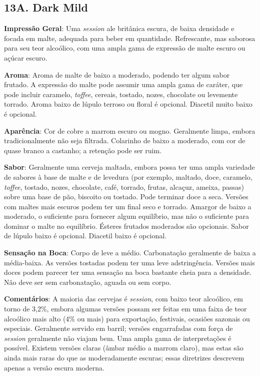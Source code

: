 \subsection*{13A. Dark Mild}
\textbf{Impressão Geral}: Uma \textit{session} ale britânica escura, de baixa densidade e focada em malte, adequada para beber em quantidade. Refrescante, mas saborosa para seu teor alcoólico, com uma ampla gama de expressão de malte escuro ou açúcar escuro.

\textbf{Aroma}: Aroma de malte de baixo a moderado, podendo ter algum sabor frutado. A expressão do malte pode assumir uma ampla gama de caráter, que pode incluir caramelo, \textit{toffee}, cereais, tostado, nozes, chocolate ou levemente torrado. Aroma baixo de lúpulo terroso ou floral é opcional. Diacetil muito baixo é opcional.

\textbf{Aparência}: Cor de cobre a marrom escuro ou mogno. Geralmente limpa, embora tradicionalmente não seja filtrada. Colarinho de baixo a moderado, com cor de quase branco a castanho; a retenção pode ser ruim.

\textbf{Sabor}: Geralmente uma cerveja maltada, embora possa ter uma ampla variedade de sabores à base de malte e de levedura (por exemplo, maltado, doce, caramelo, \textit{toffee}, tostado, nozes, chocolate, café, torrado, frutas, alcaçuz, ameixa, passas) sobre uma base de pão, biscoito ou tostado. Pode terminar doce a seca. Versões com maltes mais escuros podem ter um final seco e torrado. Amargor de baixo a moderado, o suficiente para fornecer algum equilíbrio, mas não o suficiente para dominar o malte no equilíbrio. Ésteres frutados moderados são opcionais. Sabor de lúpulo baixo é opcional. Diacetil baixo é opcional.

\textbf{Sensação na Boca}: Corpo de leve a médio. Carbonatação geralmente de baixa a média-baixa. As versões tostadas podem ter uma leve adstringência. Versões mais doces podem parecer ter uma sensação na boca bastante cheia para a densidade. Não deve ser sem carbonatação, aguada ou sem corpo.

\textbf{Comentários}: A maioria das cervejas é \textit{session}, com baixo teor alcoólico, em torno de 3,2\%, embora algumas versões possam ser feitas em uma faixa de teor alcoólico mais alto (4\% ou mais) para exportação, festivais, ocasiões sazonais ou especiais. Geralmente servido em barril; versões engarrafadas com força de \textit{session} geralmente não viajam bem. Uma ampla gama de interpretações é possível. Existem versões claras (âmbar médio a marrom claro), mas estas são ainda mais raras do que as moderadamente escuras; essas diretrizes descrevem apenas a versão escura moderna.

